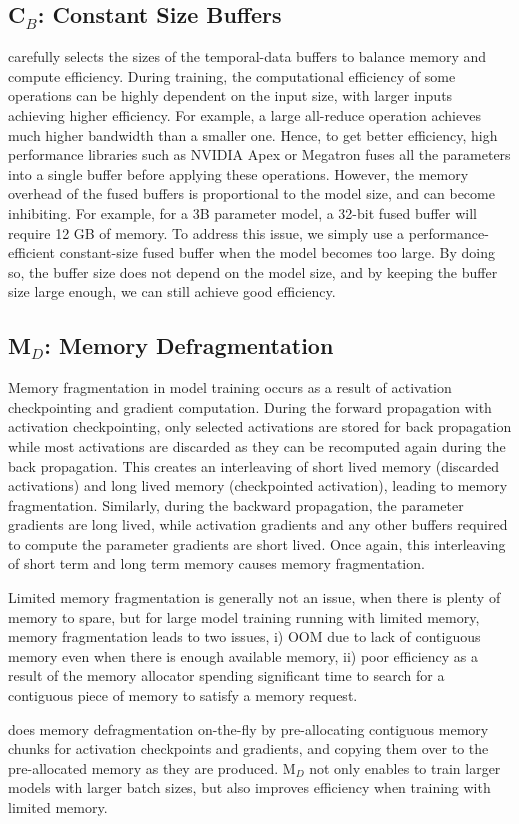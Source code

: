 \subsection{C$_B$: Constant Size Buffers}\label{sec:buffer}
\name carefully selects the sizes of the temporal-data buffers to balance memory and compute efficiency.
During training, the computational efficiency of some operations can be highly dependent on the input size, with larger inputs achieving higher efficiency. For example, a large all-reduce operation achieves much higher bandwidth than a smaller one. Hence, to get better efficiency, high performance libraries such as NVIDIA Apex or Megatron fuses all the parameters into a single buffer before applying these operations. However, the memory overhead of the fused buffers is proportional to the model size, and can become inhibiting. For example, for a 3B parameter model, a 32-bit fused buffer will require 12 GB of memory. To address this issue, we simply use a performance-efficient constant-size fused buffer when the model becomes too large. By doing so, the buffer size does not depend on the model size, and by keeping the buffer size large enough, we can still achieve good efficiency.

\subsection{M$_D$: Memory Defragmentation}
Memory fragmentation in model training occurs as a result of activation checkpointing and gradient computation. During the forward propagation with activation checkpointing, only selected activations are stored for back propagation while most activations are discarded as they can be recomputed again during the back propagation. This creates an interleaving of short lived memory (discarded activations) and long lived memory (checkpointed activation), leading to memory fragmentation. Similarly, during the backward propagation, the parameter gradients are long lived, while activation gradients and any other buffers required to compute the parameter gradients are short lived. Once again, this interleaving of short term and long term memory causes memory fragmentation.

Limited memory fragmentation is generally not an issue, when there is plenty of memory to spare, but for large model training running with limited memory, memory fragmentation leads to two issues, i) OOM due to lack of contiguous memory even when there is enough available memory, ii) poor efficiency as a result of the memory allocator spending significant time to search for a contiguous piece of memory to satisfy a memory request.

\name does memory defragmentation on-the-fly by pre-allocating contiguous memory chunks for activation checkpoints and gradients, and copying them over to the pre-allocated memory as they are produced. M$_D$ not only enables \name to train larger models with larger batch sizes, but also improves efficiency when training with limited memory.  
  
